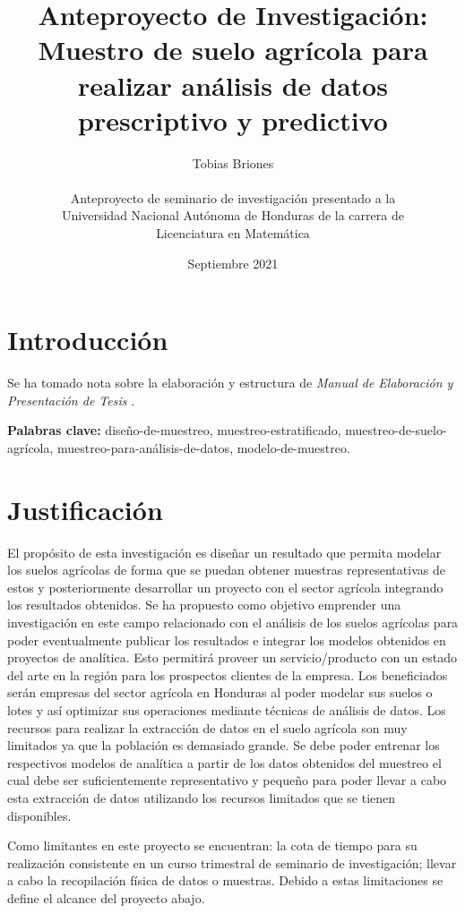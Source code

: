 \documentclass{report}
\title{Anteproyecto de Investigación: Muestro de suelo agrícola para realizar análisis de datos prescriptivo y predictivo}
\author{
Tobias Briones\\\\
Anteproyecto de seminario de investigación presentado a la\\
Universidad Nacional Autónoma de Honduras de la carrera de\\
Licenciatura en Matemática
}
\date{Septiembre 2021}
\begin{document}
\maketitle

\tableofcontents


\section{Introducción}

Se ha tomado nota sobre la elaboración y estructura de \textit{Manual de Elaboración y Presentación de Tesis} \cite{universidad-san-carlos-2016}.

\textbf{Palabras clave:} diseño-de-muestreo, muestreo-estratificado, muestreo-de-suelo-agrícola, muestreo-para-análisis-de-datos, modelo-de-muestreo.


\section{Justificación}

El propósito de esta investigación es diseñar un resultado que permita modelar los suelos agrícolas de forma que se puedan obtener muestras representativas de estos y posteriormente desarrollar un proyecto con el sector agrícola integrando los resultados obtenidos. Se ha propuesto como objetivo emprender una investigación en este campo relacionado con el análisis de los suelos agrícolas para poder eventualmente publicar los resultados e integrar los modelos obtenidos en proyectos de analítica. Esto permitirá proveer un servicio/producto con un estado del arte en la región para los prospectos clientes de la empresa. Los beneficiados serán empresas del sector agrícola en Honduras al poder modelar sus suelos o lotes y así optimizar sus operaciones mediante técnicas de análisis de datos. Los recursos para realizar la extracción de datos en el suelo agrícola son muy limitados ya que la población es demasiado grande. Se debe poder entrenar los respectivos modelos de analítica a partir de los datos obtenidos del muestreo el cual debe ser suficientemente representativo y pequeño para poder llevar a cabo esta extracción de datos utilizando los recursos limitados que se tienen disponibles.

\bigbreak

Como limitantes en este proyecto se encuentran: la cota de tiempo para su realización consistente en un curso trimestral de seminario de investigación; llevar a cabo la recopilación física de datos o muestras. Debido a estas limitaciones se define el alcance del proyecto abajo.
\end{document}
